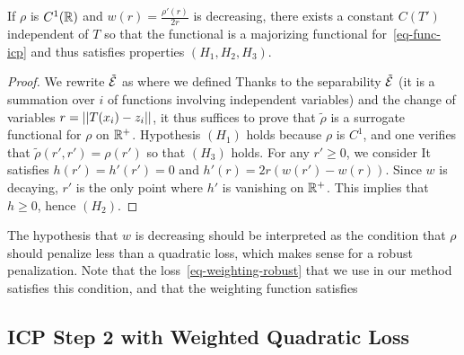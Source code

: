 \begin{prop}
	If $\rho$ is $C^1(\mathbb{R})$ and $w(r) = \frac{\rho'(r)}{2 r}$ is decreasing, there exists 
	a constant $C(T')$ independent of $T$ so that the functional
	is a majorizing functional for~\eqref{eq-func-icp} and thus satisfies properties $(H_1,H_2,H_3)$. 
\end{prop}

\begin{proof}
	We rewrite $\tilde{\mathcal{E}}$ as
	where we defined 
	Thanks to the separability $\tilde{\mathcal{E}}$ (it is a summation over $i$ of functions involving independent variables) and the change of variables $r = ||  T(x_i) - z_i  ||$, it thus suffices to prove that $\tilde\rho$ is a surrogate functional for $\rho$ on $\mathbb{R}^+$.
	Hypothesis $(H_1)$ holds because $\rho$ is $C^1$, and one verifies that $\tilde \rho( r',r' ) = \rho(r')$ so that $(H_3)$ holds.
	For any $r' \geq 0$, we consider 
	It satisfies $h(r')=h'(r')=0$ and $h'(r) = 2r(w(r') - w(r))$.
	Since $w$ is decaying, $r'$ is the only point where $h'$ is vanishing on $\mathbb{R}^+$. This implies that $h \geq 0$, hence $(H_2)$.
\end{proof}

The hypothesis that $w$ is decreasing should be interpreted as the condition that $\rho$ should penalize less than a quadratic loss, which makes sense for a robust penalization. Note that the loss~\eqref{eq-weighting-robust} that we use in our method satisfies this condition, and that the weighting function satisfies

\subsection{ICP Step 2 with Weighted Quadratic Loss}
\label{sec-icp-step2-details}

